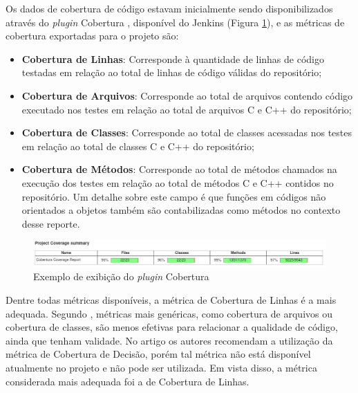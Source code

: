 \documentclass[11.5pt]{article}
\begin{document}
Os dados de cobertura de código estavam inicialmente sendo disponibilizados através do
\textit{plugin} Cobertura \cite{jenkinsCobertura}, disponível do Jenkins
(Figura \ref{fig:pluginCobertura}), e as métricas de cobertura exportadas para o projeto são:
\begin{itemize}
    \item \textbf{Cobertura de Linhas}: Corresponde à quantidade de linhas de código testadas em
          relação ao total de linhas de código válidas do repositório;

    \item \textbf{Cobertura de Arquivos}: Corresponde ao total de arquivos contendo código executado
          nos testes em relação ao total de arquivos C e C++ do repositório;

    \item \textbf{Cobertura de Classes}: Corresponde ao total de classes acessadas nos testes em
          relação ao total de classes C e C++ do repositório;

    \item \textbf{Cobertura de Métodos}: Corresponde ao total de métodos chamados na execução dos
          testes em relação ao total de métodos C e C++ contidos no repositório.
          Um detalhe sobre este campo é que funções em códigos não orientados a objetos também são
          contabilizadas como métodos no contexto desse reporte.
\end{itemize}

\begin{figure}[ht]
    \centering
    \includegraphics[width=1.0\textwidth]{cobertura.jpeg}
    \caption{Exemplo de exibição do \textit{plugin} Cobertura}
    \label{fig:pluginCobertura}
\end{figure}

Dentre todas métricas disponíveis, a métrica de Cobertura de Linhas é a mais adequada.
Segundo \cite{coverageMetaAnalysis}, métricas mais genéricas, como cobertura de arquivos ou
cobertura de classes, são menos efetivas para relacionar a qualidade de código, ainda que tenham
validade.
No artigo os autores recomendam a utilização da métrica de Cobertura de Decisão, porém tal métrica
não está disponível atualmente no projeto e não pode ser utilizada.
Em vista disso, a métrica considerada mais adequada foi a de Cobertura de Linhas.
\end{document}
